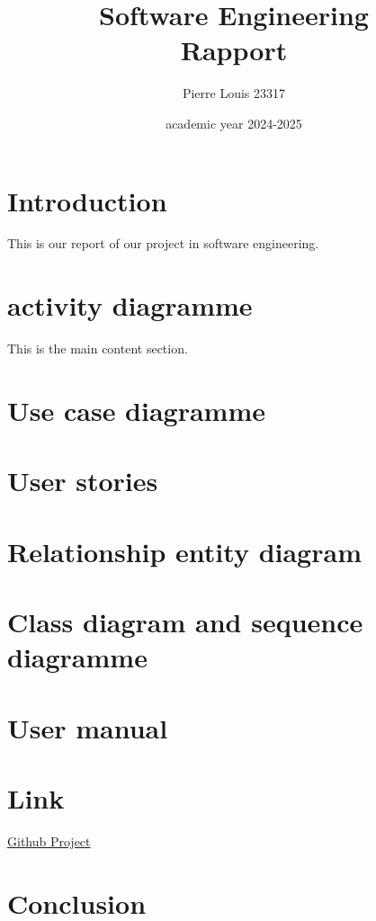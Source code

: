 \documentclass{article}
\title{Software Engineering\\ Rapport}
\author{Pierre Louis 23317\\
}
\date{academic year 2024-2025}
\begin{document}
\maketitle


\section{Introduction}
This is our report of our project in software engineering.


\section{activity diagramme}
This is the main content section.

\section{Use case diagramme}

\section{User stories}

\section{Relationship entity diagram}

\section{Class diagram and sequence diagramme}

\section{User manual}

\section{Link}
\href{https://github.com/I42I/Kitbox_app}{Github Project}



\section{Conclusion}
\end{document}
